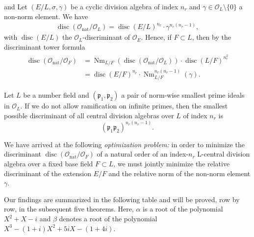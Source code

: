 \documentclass[smallextended]{svjour3}
\newcommand{\mcf}{\Or_{F}}
\newcommand{\mcl}{\Or_{L}}
\newcommand{\Or}{\mathcal{O}}
\DeclareMathOperator{\Nm}{Nm}
\DeclareMathOperator{\nat}{nat}
\DeclareMathOperator{\disc}{disc}
\begin{document}
\begin{lemma}{\cite[Lem.~5.4]{VHLR} and \cite[Prop.~5.3]{HL}}
\label{pro:disc}
Let $(E/L,\sigma,\gamma)$ be a cyclic division algebra of index $n_r$ and $\gamma \in \mcl\setminus\{0\}$ a non-norm element. We have  
\begin{align*}
	\disc(\Or_{\nat}/\mcl) = \disc(E/L)^{n_r}\cdot\gamma^{n_r(n_r-1)},
\end{align*} 
with $\disc(E/L)$ the $\Or_L$-discriminant of $\Or_E$. Hence, if $F \subset L$, then by the discriminant tower formula
\begin{align}
\label{eqn:disc}
\begin{split}
	\disc(\Or_{\nat}/\mcf) &=
\Nm_{L/F}(\disc(\Or_{\nat}/\mcl))\cdot \disc(L/F)^{n_r^2} \\
&= \disc(E/F)^{n_r}\cdot \Nm_{L/F}^{n_r(n_r-1)}(\gamma).
\end{split}
\end{align}
\end{lemma}

\begin{lemma} \cite[Thm.~2.4.26]{Veh}
\label{pro:bound}
Let $L$ be a number field and $(\mathfrak{p}_1, \mathfrak{p}_2)$ a pair of norm-wise smallest prime ideals in $\mcl$. If we do not allow ramification on infinite primes, then the smallest possible discriminant of all central division algebras over $L$ of index $n_r$ is 
\begin{equation}
\label{eqn:bound}
	(\mathfrak{p}_1\mathfrak{p}_2)^{n_r(n_r-1)}.
\end{equation}
\end{lemma}

We have arrived at the following \emph{optimization problem:} in order to minimize the discriminant $\disc(\Or_{\nat}/\mcf)$ of a natural order of an index-$n_r$ L-central division algebra over a fixed base field $F\subset L$, we must jointly minimize the relative discriminant of the extension $E/F$ and the relative norm of the non-norm element $\gamma$. 

Our findings are summarized in the following table and will be proved, row by row, in the subsequent five theorems. Here, $\alpha$ is a root of the polynomial $X^2+X-i$ and $\beta$ denotes a root of the polynomial $X^3-(1+i)X^2+5iX-(1+4i)$.
 
\end{document}
